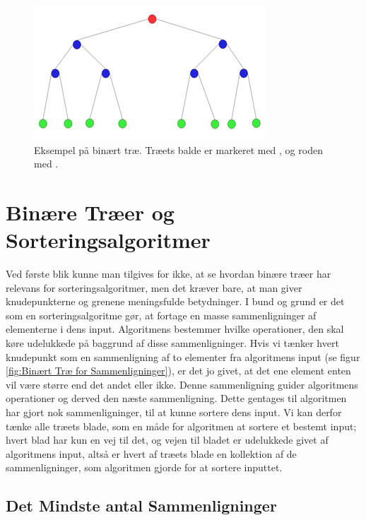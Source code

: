 \begin{figure}
	\begin{center}
		\includegraphics[scale=1]{../img/binary_tree.png}
	\end{center}
	\caption{Eksempel på binært træ. Træets balde er markeret med , og roden med . \cite{binaert-trae}}
	\label{fig:Eksempel på binært træ}
\end{figure} 



\section{Binære Træer og Sorteringsalgoritmer}
\label{sec:Binære Træer og Sorteringsalgoritmer}

Ved første blik kunne man tilgives for ikke, at se hvordan binære træer har relevans for sorteringsalgoritmer, men det kræver bare, at man giver knudepunkterne og grenene meningsfulde betydninger. I bund og grund er det som en sorteringsalgoritme gør, at fortage en masse sammenligninger af elementerne i dens input. Algoritmens bestemmer hvilke operationer, den skal køre udelukkede på baggrund af disse sammenligninger. Hvis vi tænker hvert knudepunkt som en sammenligning af to elementer fra algoritmens input (se figur \ref{fig:Binært Træ for Sammenligninger}), er det jo givet, at det ene element enten vil være større end det andet eller ikke. Denne sammenligning guider algoritmens operationer og derved den næste sammenligning. Dette gentages til algoritmen har gjort nok sammenligninger, til at kunne sortere dens input. Vi kan derfor tænke alle træets blade, som en måde for algoritmen at sortere et bestemt input; hvert blad har kun en vej til det, og vejen til bladet er udelukkede givet af algoritmens input, altså er hvert af træets blade en kollektion af de sammenligninger, som algoritmen gjorde for at sortere inputtet. 

\subsection{Det Mindste antal Sammenligninger}%
\label{sub:Det Mindste antal Sammenligninger}

